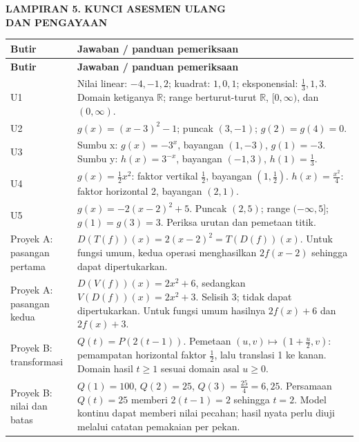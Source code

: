 \documentclass[11pt,a4paper]{article}
\begin{document}
\clearpage
\begin{center}\bfseries\large LAMPIRAN 5. KUNCI ASESMEN ULANG\\[2pt] DAN PENGAYAAN\end{center}\medskip
{\small\setlength{\tabcolsep}{2mm}\renewcommand{\arraystretch}{1.35}\begin{longtable}{|>{\raggedright\arraybackslash}p{31.791mm}|>{\raggedright\arraybackslash}p{137.759mm}|}\hline
\rowcolor{gray!10}\textbf{Butir} & \textbf{Jawaban / panduan pemeriksaan}\\ \hline
\endfirsthead
\rowcolor{gray!10}\textbf{Butir} & \textbf{Jawaban / panduan pemeriksaan}\\ \hline
\endhead
U1 & Nilai linear: \(-4,-1,2\); kuadrat: \(1,0,1\); eksponensial: \(\frac13,1,3\). Domain ketiganya \(\mathbb R\); range berturut-turut \(\mathbb R\), \([0,\infty)\), dan \((0,\infty)\).\\ \hline
U2 & \(g(x)=(x-3)^2-1\); puncak \((3,-1)\); \(g(2)=g(4)=0\).\\ \hline
U3 & Sumbu x: \(g(x)=-3^x\), bayangan \((1,-3)\), \(g(1)=-3\). Sumbu y: \(h(x)=3^{-x}\), bayangan \((-1,3)\), \(h(1)=\frac13\).\\ \hline
U4 & \(g(x)=\frac12x^2\): faktor vertikal \(\frac12\), bayangan \(\left(1,\frac12\right)\). \(h(x)=\frac{x^2}{4}\): faktor horizontal 2, bayangan \((2,1)\).\\ \hline
U5 & \(g(x)=-2(x-2)^2+5\). Puncak \((2,5)\); range \((-\infty,5]\); \(g(1)=g(3)=3\). Periksa urutan dan pemetaan titik.\\ \hline
Proyek A: pasangan pertama & \(D(T(f))(x)=2(x-2)^2=T(D(f))(x)\). Untuk fungsi umum, kedua operasi menghasilkan \(2f(x-2)\) sehingga dapat dipertukarkan.\\ \hline
Proyek A: pasangan kedua & \(D(V(f))(x)=2x^2+6\), sedangkan \(V(D(f))(x)=2x^2+3\). Selisih 3; tidak dapat dipertukarkan. Untuk fungsi umum hasilnya \(2f(x)+6\) dan \(2f(x)+3\).\\ \hline
Proyek B: transformasi & \(Q(t)=P(2(t-1))\). Pemetaan \((u,v)\mapsto\left(1+\frac u2,v\right)\): pemampatan horizontal faktor \(\frac12\), lalu translasi 1 ke kanan. Domain hasil \(t\ge1\) sesuai domain asal \(u\ge0\).\\ \hline
Proyek B: nilai dan batas & \(Q(1)=100\), \(Q(2)=25\), \(Q(3)=\frac{25}{4}=6{,}25\). Persamaan \(Q(t)=25\) memberi \(2(t-1)=2\) sehingga \(t=2\). Model kontinu dapat memberi nilai pecahan; hasil nyata perlu diuji melalui catatan pemakaian per pekan.\\ \hline
\end{longtable}}\medskip
\end{document}
